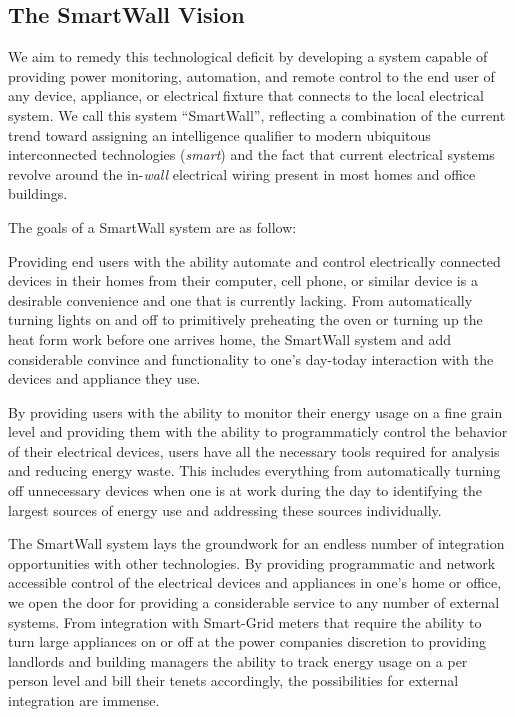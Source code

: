 \documentclass[12pt]{article}
\begin{document}
\subsection{The SmartWall Vision}
We aim to remedy this technological deficit
by developing a system capable of providing
power monitoring, automation, and remote control
to the end user of any device, appliance, or electrical fixture that
connects to the local electrical system. We call this system
``SmartWall'', reflecting a combination of the current trend
toward assigning an intelligence qualifier to modern ubiquitous
interconnected technologies (\emph{smart}) and the fact that
current electrical systems
revolve around the in-\emph{wall} electrical wiring present in most homes and
office buildings.

The goals of a SmartWall system are as follow:
\begin{description}
  \setlength{\itemsep}{0pt}
  \setlength{\parskip}{0pt}
  \setlength{\parsep}{0pt}
\item[Convenience:] Providing end users with the ability automate and
  control electrically connected devices in their homes from their
  computer, cell phone, or similar device is a desirable convenience
  and one that is currently lacking. From automatically turning lights
  on and off to primitively preheating the oven or turning up the heat
  form work before one arrives home, the SmartWall system and add
  considerable convince and functionality to one's day-today
  interaction with the devices and appliance they use.
\item[Energy Conservation:] By providing users with the ability to
  monitor their energy usage on a fine grain level and providing them
  with the ability to programmaticly control the behavior of their electrical
  devices, users have all the necessary tools required for analysis
  and reducing energy waste. This includes everything from
  automatically turning off unnecessary devices when one is at work
  during the day to identifying the largest sources of energy use and
  addressing these sources individually.
\item[Integration Framework:] The SmartWall system lays the groundwork for an
  endless number of integration opportunities with other
  technologies. By providing programmatic and network accessible
  control of the electrical devices and appliances in one's home or
  office, we open the door for providing a considerable service to any
  number of external systems. From integration with Smart-Grid meters
  that require the ability to turn large appliances on or off at the
  power companies discretion to providing landlords and building
  managers the ability to track energy usage on a per person level and
  bill their tenets accordingly, the possibilities for external
  integration are immense.
\end{description}
\end{document}
